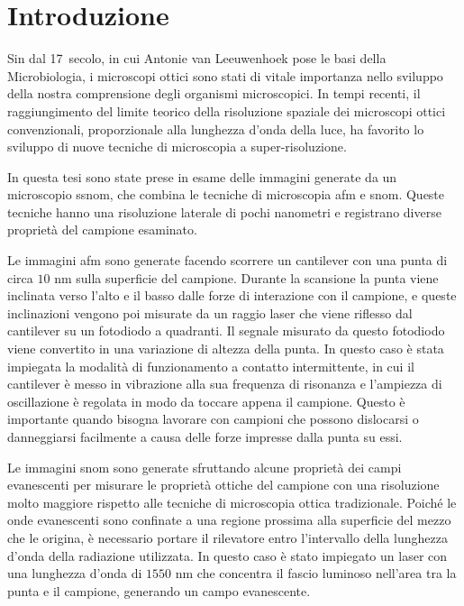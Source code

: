 \documentclass[../main.tex]{subfiles}
\begin{document}
\chapter*{Introduzione}

Sin dal 17\textdegree\ secolo, in cui Antonie van Leeuwenhoek pose le basi della Microbiologia\cite{lane_2015, dobell_1923, corliss_1975}, i microscopi ottici sono stati di vitale importanza nello sviluppo della nostra comprensione degli organismi microscopici. In tempi recenti, il raggiungimento del limite teorico della risoluzione spaziale dei microscopi ottici convenzionali, proporzionale alla lunghezza d'onda della luce, ha favorito lo sviluppo di nuove tecniche di microscopia a super-risoluzione.\cite{ohtsu_2020}

In questa tesi sono state prese in esame delle immagini generate da un microscopio \acrshort{ssnom}, che combina le tecniche di microscopia \acrshort{afm} e \acrshort{snom}. Queste tecniche hanno una risoluzione laterale di pochi nanometri e registrano diverse proprietà del campione esaminato. 

Le immagini \acrshort{afm} sono generate facendo scorrere un cantilever con una punta di circa $10$ nm sulla superficie del campione. Durante la scansione la punta viene inclinata verso l'alto e il basso dalle forze di interazione con il campione, e queste inclinazioni vengono poi misurate da un raggio laser che viene riflesso dal cantilever su un fotodiodo a quadranti. Il segnale misurato da questo fotodiodo viene convertito in una variazione di altezza della punta. In questo caso è stata impiegata la modalità di funzionamento a contatto intermittente, in cui il cantilever è messo in vibrazione alla sua frequenza di risonanza e l'ampiezza di oscillazione è regolata in modo da toccare appena il campione. Questo è importante quando bisogna lavorare con campioni che possono dislocarsi o danneggiarsi facilmente a causa delle forze impresse dalla punta su essi.

Le immagini \acrshort{snom} sono generate sfruttando alcune proprietà dei campi evanescenti per misurare le proprietà ottiche del campione con una risoluzione molto maggiore rispetto alle tecniche di microscopia ottica tradizionale. Poiché le onde evanescenti sono confinate a una regione prossima alla superficie del mezzo che le origina, è necessario portare il rilevatore entro l'intervallo della lunghezza d'onda della radiazione utilizzata. In questo caso è stato impiegato un laser con una lunghezza d'onda di $1550$ nm che concentra il fascio luminoso nell'area tra la punta e il campione, generando un campo evanescente.
\end{document}
